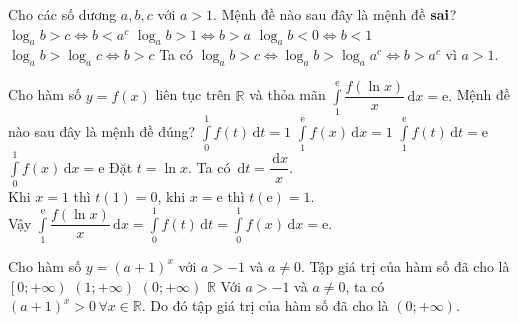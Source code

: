 \begin{ex}%
	Cho các số dương $a, b,c $ với $a>1$. Mệnh đề nào sau đây là mệnh đề $\bf{sai}$?
		\choice
	{\True $\log_ab>c \Leftrightarrow b<a^c$}
	{$\log_ab>1 \Leftrightarrow b>a$}
	{$\log_ab<0 \Leftrightarrow b<1$}
	{$\log_ab > \log_ac \Leftrightarrow b>c$}
	\loigiai
	{ Ta có $\log_ab>c \Leftrightarrow \log_ab>\log_aa^c \Leftrightarrow b>a^c$ vì $a>1$.
	}
\end{ex}

\begin{ex}%
	Cho hàm số $y=f(x)$ liên tục trên $\mathbb{R}$ và thỏa mãn $\displaystyle\int\limits_1^\mathrm{e} \dfrac{f(\ln x)}{x}\mathrm{\,d}x =\mathrm{e}.$ Mệnh đề nào sau đây là mệnh đề đúng?
		\choice
	{$\displaystyle\int\limits_0^1 f(t)\mathrm{\,d}t =1$}
	{$\displaystyle\int\limits_1^\mathrm{e} f(x)\mathrm{\,d}x =1$}
	{$\displaystyle\int\limits_1^\mathrm{e} f(t)\mathrm{\,d}t =\mathrm{e}$}
	{\True $\displaystyle\int\limits_0^1 f(x)\mathrm{\,d}x = \mathrm{e}$}
	\loigiai
	{ Đặt $t=\ln x$. Ta có $\mathrm{\,d}t= \dfrac{\mathrm{\,d}x}{x}$.\\
		Khi $x=1$ thì $t(1)=0$, khi $x=\mathrm{e}$ thì $t(\mathrm{e})=1.$\\
		Vậy $\displaystyle\int\limits_1^\mathrm{e} \dfrac{f(\ln x)}{x}\mathrm{\,d}x = \displaystyle\int\limits_0^1 f(t)\mathrm{\,d}t =\displaystyle\int\limits_0^1 f(x)\mathrm{\,d}x = \mathrm{e}$.
	}
\end{ex}

\begin{ex}%
	Cho hàm số $y=(a+1)^x$ với $a>-1$ và $a \neq 0$. Tập giá trị của hàm số đã cho là
		\choice
	{$\left[ 0;+\infty \right)$}
	{$(1;+\infty)$}
	{\True $(0;+\infty)$}
	{$\mathbb{R}$}
	\loigiai
	{ Với $a>-1$ và $a \neq 0$, ta có $(a+1)^x>0 \, \forall x \in \mathbb{R}$. Do đó 
		tập giá trị của hàm số đã cho là $(0;+\infty)$.
	}
\end{ex}

